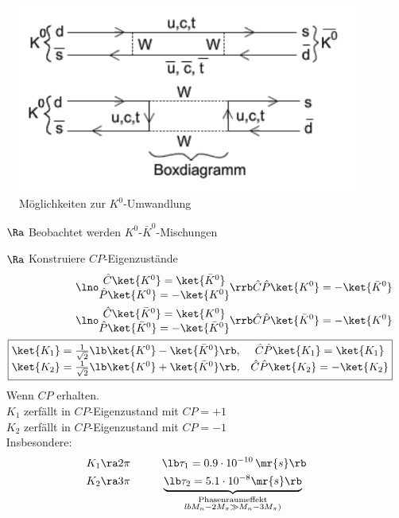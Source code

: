 \begin{itemize}
\begin{figure}[!ht]
\centering
\includegraphics[width=.5\textwidth]{imgs/ep5-fig-8-11.pdf}
\caption{Möglichkeiten zur $K^0$-Umwandlung \label{fig:8.11}}
\end{figure}

\begin{itemize}
\item[$\Ra$] Beobachtet werden $K^0$-$\bar{K}^0$-Mischungen
\item[$\Ra$] Konstruiere $CP$-Eigenzustände
\begin{align}
\lno \begin{matrix}
\hat{C} \ket{K^0} = \ket{\bar{K}^0}\\
\hat{P} \ket{K^0} = - \ket{K^0}
\end{matrix}\rrb \hat{C}\hat{P} \ket{K^0} = - \ket{\bar{K}^0}\nonumber \\
\lno \begin{matrix}
\hat{C} \ket{\bar{K}^0} = \ket{K^0}\\
\hat{P} \ket{\bar{K}^0} = - \ket{\bar{K}^0}
\end{matrix}\rrb \hat{C}\hat{P} \ket{\bar{K}^0} = - \ket{K^0}\nonumber \\
\boxed{\begin{matrix}
\ket{K_1} = \frac{1}{\sqrt{2}} \lb  \ket{K^0} - \ket{\bar{K}^0} \rb , & \hat{C}\hat{P} \ket{K_1} = \ket{K_1}\\
\ket{K_2} = \frac{1}{\sqrt{2}} \lb  \ket{K^0} + \ket{\bar{K}^0}\rb , & \hat{C}\hat{P}\ket{K_2} = - \ket{K_2}
\end{matrix}}
\end{align}
Wenn $CP$ erhalten.\\
$K_1$ zerfällt in $CP$-Eigenzustand mit $CP=+1$\\
$K_2$ zerfällt in $CP$-Eigenzustand mit $CP=-1$\\
Insbesondere:
\begin{align*}
K_1 \ra 2\pi \hspace*{1cm} &\lb \tau_1 = 0.9 \cdot 10^{-10}\,\mr{s}\rb \\
K_2 \ra 3 \pi \hspace*{1cm} &\underbrace{\lb  \tau_2 = 5.1\cdot 10^{-8}\mr{s}\rb }_{\substack{\text{Phasenraumeffekt}\\lb M_n - 2M_\pi \gg M_n - 3M_\pi)}}

\end{align*}
\end{itemize}
\end{itemize}
